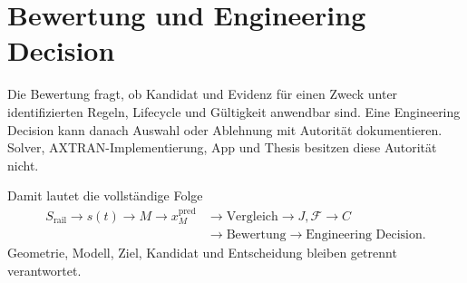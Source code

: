 \section{Bewertung und Engineering Decision}

Die Bewertung fragt, ob Kandidat und Evidenz für einen Zweck unter
identifizierten Regeln, Lifecycle und Gültigkeit anwendbar sind. Eine
Engineering Decision kann danach Auswahl oder Ablehnung mit Autorität
dokumentieren. Solver, AXTRAN-Implementierung, App und Thesis besitzen diese
Autorität nicht.

Damit lautet die vollständige Folge
\[
\begin{aligned}
S_{\mathrm{rail}}\to s(t)\to M\to x_M^{\mathrm{pred}}
&\to\text{Vergleich}\to J,\mathcal F\to C\\
&\to\text{Bewertung}\to\text{Engineering Decision}.
\end{aligned}
\]
Geometrie, Modell, Ziel, Kandidat und Entscheidung bleiben getrennt
verantwortet.
